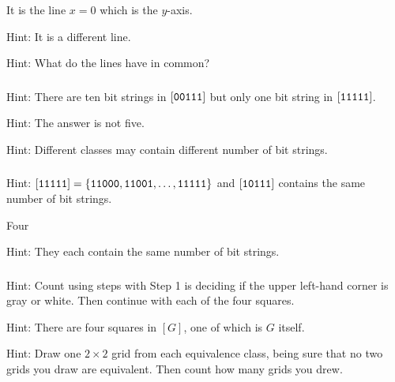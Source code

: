 \subsubsection*{ \answers}
\begin{apart}
    \item It is the line $x=0$ which is the $y$-axis.
     \item Hint: It is a different line.
     \item Hint: What do the lines have in common?
\end{apart}

\subsubsection*{ \answers}
\begin{apart}
    \item Hint: There are ten bit strings in $[\texttt{00111}]$ but only one bit string in $[\texttt{11111}]$.
    \item Hint: The answer is not five.
    \item Hint: Different classes may contain different number of bit strings.
\end{apart}

\subsubsection*{ \answers}
\begin{apart}
    \item Hint: $[\texttt{11111}] = \{\texttt{11000}, \texttt{11001}, \ldots, \texttt{11111}\}$ and $[\texttt{10111}]$ contains the same number of bit strings.
    \item Four
    \item Hint: They each contain the same number of bit strings.
\end{apart}

\subsubsection*{ \answers}
\begin{apart}
    \item Hint: Count using steps with Step 1 is deciding if the upper left-hand corner is gray or white.  Then continue with each of the four squares.
    \item Hint: There are four squares in $[G]$, one of which is $G$ itself.
    \item Hint: Draw one $2 \times 2$ grid from each equivalence class, being sure that no two grids you draw are equivalent.  Then count how many grids you drew.
\end{apart}

